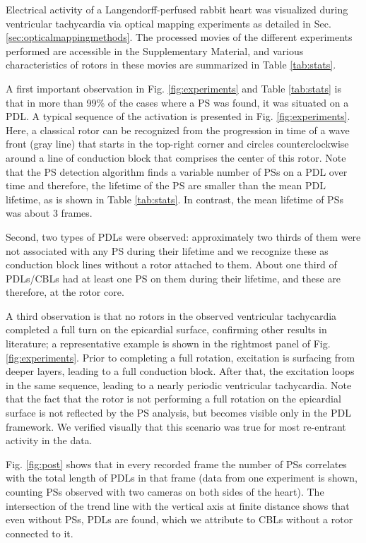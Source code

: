 \documentclass{article}
\begin{document}
Electrical activity of a Langendorff-perfused rabbit heart was visualized during ventricular tachycardia via optical mapping experiments \citep{Kulkarni:2018} as detailed in Sec. \ref{sec:opticalmappingmethods}.
The processed movies of the different experiments performed are accessible in the Supplementary Material, and various characteristics of rotors in these movies are summarized in Table \ref{tab:stats}.

A first important observation in Fig. \ref{fig:experiments} and Table \ref{tab:stats} is that in more than 99\% of the cases where a PS was found, it was situated on a PDL. A typical sequence of the activation is presented in Fig. \ref{fig:experiments}. Here, a classical rotor can be recognized from the progression in time of a wave front (gray line) that starts in the top-right corner and circles counterclockwise around a line of conduction block that comprises the center of this rotor. Note that the PS detection algorithm finds a variable number of PSs on a PDL over time and therefore, the lifetime of the PS are smaller than the mean PDL lifetime, as is shown in Table \ref{tab:stats}. In contrast, the mean lifetime of PSs was about 3 frames. 

Second, two types of PDLs were observed: approximately two thirds of them were not associated with any PS during their lifetime and we recognize these as conduction block lines without a rotor attached to them. About one third of PDLs/CBLs had at least one PS on them during their lifetime, and these are therefore, at the rotor core. 

A third observation is that no rotors in the observed ventricular tachycardia completed a full turn on the epicardial surface, confirming other results in literature; a representative example is shown in the rightmost panel of Fig. \ref{fig:experiments}. Prior to completing a full rotation, excitation is surfacing from deeper layers, leading to a full conduction block. After that, the excitation loops in the same sequence, leading to a nearly periodic ventricular tachycardia. Note that the fact that the rotor is not performing a full rotation on the epicardial surface is not reflected by the PS analysis, but becomes visible only in the PDL framework. We verified visually that this scenario was true for most re-entrant activity in the data. %

Fig. \ref{fig:post} shows that in every recorded frame the number of PSs correlates with the total length of PDLs in that frame (data from one experiment is shown, counting PSs observed with two cameras on both sides of the heart). The intersection of the trend line with the vertical axis at finite distance shows that even without PSs, PDLs are found, which we attribute to CBLs without a rotor connected to it. %
\end{document}
